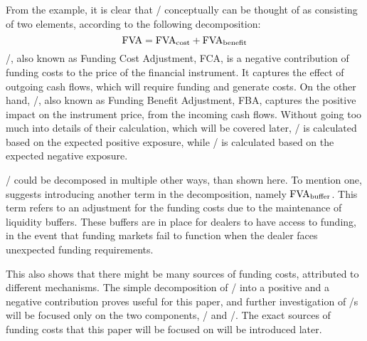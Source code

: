 \documentclass[main.tex]{subfiles}
\begin{document}
        From the example, it is clear that \FVA/ conceptually can be thought of 
        as consisting of two elements, according to the following decomposition:
        \begin{equation*}
            \FVA/ = \FCA/ + \FBA/
        \end{equation*}
        \FCA/, also known as Funding Cost Adjustment, FCA, 
        is a negative contribution of funding costs to the price of the financial instrument.
        It captures the effect of outgoing cash flows, which will require funding and generate costs.
        On the other hand, \FBA/, also known as Funding Benefit Adjustment, FBA, 
        captures the positive impact on the instrument price, from the incoming cash flows.
        Without going too much into details of their calculation, which will be covered later,
        \FCA/ is calculated based on the expected positive exposure, 
        while \FBA/ is calculated based on the expected negative exposure. 

        \FVA/ could be decomposed in multiple other ways, than shown here. 
        To mention one, \textcite{KPMGFVA} suggests introducing another term in the decomposition, 
        namely $\FVA/_{\text{buffer}}$.
        This term refers to an adjustment for the funding costs
        due to the maintenance of liquidity buffers. 
        These buffers are in place for dealers to have access to funding, in the event
        that funding markets fail to function when the dealer faces unexpected funding requirements.

        This also shows that there might be many sources of funding costs,
        attributed to different mechanisms.
        The simple decomposition of \FVA/ into a positive and a negative contribution
        proves useful for this paper,
        and further investigation of \FVA/s will be focused only on the two components,
        \FCA/ and \FBA/.
        The exact sources of funding costs that this paper will be focused on
        will be introduced later.
\end{document}
